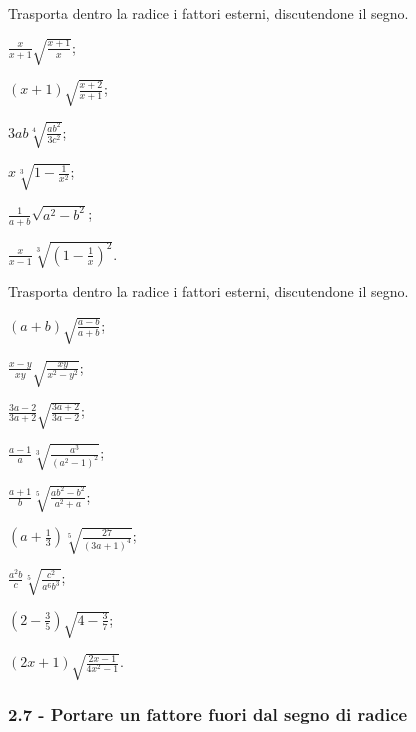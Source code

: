 \begin{esercizio}[\Ast]
 \label{ese:2.51}
Trasporta dentro la radice i fattori esterni, discutendone il segno.
 \begin{multicols}{3}
 \begin{enumeratea}
 \item $\frac{x}{x+1}\sqrt{\frac{x+1}{x}}$;
 \item $(x+1)\sqrt{\frac{x+2}{x+1}}$;
 \item $3ab\sqrt[4]{\frac{ab^2}{3c^2}}$;
 \item $x\sqrt[3]{1-\frac{1}{x^2}}$;
 \item $\frac{1}{a+b}\sqrt{a^2-b^2}$;
 \item $\frac{x}{x-1}\sqrt[3]{\left(1-\frac{1}{x}\right)^2}$.
 \end{enumeratea}
 \end{multicols}
\end{esercizio}

\begin{esercizio}[\Ast]
 \label{ese:2.52}
Trasporta dentro la radice i fattori esterni, discutendone il segno.
 \begin{multicols}{3}
 \begin{enumeratea}
 \item $(a+b)\sqrt{\frac{a-b}{a+b}}$;
 \item $\frac{x-y}{xy}\sqrt{\frac{xy}{x^2-y^2}}$;
 \item $\frac{3a-2}{3a+2}\sqrt{\frac{3a+2}{3a-2}}$;
 \item $\frac{a-1}{a}\sqrt[3]{\frac{a^3}{(a^2-1)^2}}$;
 \item $\frac{a+1}{b}\sqrt[5]{\frac{ab^2-b^2}{a^2+a}}$;
 \item $\left(a+\frac{1}{3}\right)\sqrt[5]{\frac{27}{(3a+1)^4}}$;
 \item $\frac{a^2b}{c}\sqrt[5]{\frac{c^2}{a^6b^3}}$;
 \item $\left(2-\frac{3}{5}\right)\sqrt{4-\frac{3}{7}}$;
 \item $(2x+1)\sqrt{\frac{2x-1}{4x^2-1}}$.
 \end{enumeratea}
 \end{multicols}
\end{esercizio}

\subsubsection*{2.7 - Portare un fattore fuori dal segno di radice}

